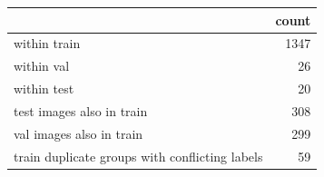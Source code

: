 \begin{tabular}{lr}
\toprule
 & count \\
\midrule
within train & 1347 \\
within val & 26 \\
within test & 20 \\
test images also in train & 308 \\
val images also in train & 299 \\
train duplicate groups with conflicting labels & 59 \\
\bottomrule
\end{tabular}
